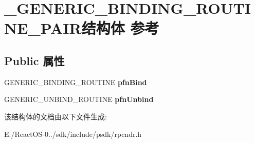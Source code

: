 \hypertarget{struct___g_e_n_e_r_i_c___b_i_n_d_i_n_g___r_o_u_t_i_n_e___p_a_i_r}{}\section{\+\_\+\+G\+E\+N\+E\+R\+I\+C\+\_\+\+B\+I\+N\+D\+I\+N\+G\+\_\+\+R\+O\+U\+T\+I\+N\+E\+\_\+\+P\+A\+I\+R结构体 参考}
\label{struct___g_e_n_e_r_i_c___b_i_n_d_i_n_g___r_o_u_t_i_n_e___p_a_i_r}
\subsection*{Public 属性}
\begin{DoxyCompactItemize}
\item 
\mbox{\label{struct___g_e_n_e_r_i_c___b_i_n_d_i_n_g___r_o_u_t_i_n_e___p_a_i_r_a1c6265d0ed3f22b6a955a1903141d826}} 
G\+E\+N\+E\+R\+I\+C\+\_\+\+B\+I\+N\+D\+I\+N\+G\+\_\+\+R\+O\+U\+T\+I\+NE {\bfseries pfn\+Bind}
\item 
\mbox{\label{struct___g_e_n_e_r_i_c___b_i_n_d_i_n_g___r_o_u_t_i_n_e___p_a_i_r_a1fe95f272b0480652681cdbff6ecd666}} 
G\+E\+N\+E\+R\+I\+C\+\_\+\+U\+N\+B\+I\+N\+D\+\_\+\+R\+O\+U\+T\+I\+NE {\bfseries pfn\+Unbind}
\end{DoxyCompactItemize}


该结构体的文档由以下文件生成\+:\begin{DoxyCompactItemize}
\item 
E\+:/\+React\+O\+S-\/0../sdk/include/psdk/rpcndr.\+h\end{DoxyCompactItemize}
